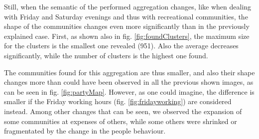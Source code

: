 \documentclass[12pt,a4paper]{article}
\begin{document}
Still, when the semantic of the performed aggregation changes, like when dealing with Friday and Saturday evenings and thus with recreational communities, the shape of the communities changes even more significantly than in the previously explained case.
First, as shown also in fig. \ref{fig:foundClusters}, the maximum size for the clusters is the smallest one revealed (951). Also the average decreases significantly, while the number of clusters is the highest one found.

The communities found for this aggregation are thus smaller, and also their shape changes more than could have been observed in all the previous shown images, as can be seen in fig. \ref{fig:partyMap}. However, as one could imagine, the difference is smaller if the Friday working hours (fig. \ref{fig:fridayworking}) are considered instead.
Among other changes that can be seen, we observed the expansion of some communities at expenses of others, while some others were shrinked or fragmentated by the change in the people behaviour. 
\end{document}
